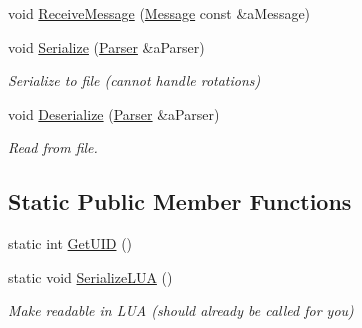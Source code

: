 \begin{DoxyCompactItemize}
\item 
void \hyperlink{classTransform_aecbe05756c579fb4e36cbf6b2e36e58c}{Receive\+Message} (\hyperlink{classMessage}{Message} const \&a\+Message)
\item 
void \hyperlink{classTransform_a2fe5546a59d933a11316966b9ec49e19}{Serialize} (\hyperlink{classParser}{Parser} \&a\+Parser)
\begin{DoxyCompactList}\small\item\em Serialize to file (cannot handle rotations) \end{DoxyCompactList}\item 
void \hyperlink{classTransform_a4bc75f2d8356608ffdbc1ec56cd86a27}{Deserialize} (\hyperlink{classParser}{Parser} \&a\+Parser)
\begin{DoxyCompactList}\small\item\em Read from file. \end{DoxyCompactList}\end{DoxyCompactItemize}
\subsection*{Static Public Member Functions}
\begin{DoxyCompactItemize}
\item 
static int \hyperlink{classTransform_a0a99fa2a6f920195d46410e0c453384d}{Get\+U\+ID} ()
\item 
static void \hyperlink{classTransform_aa992b0ff5f9e9ab334b3142b6727754e}{Serialize\+L\+UA} ()
\begin{DoxyCompactList}\small\item\em Make readable in L\+UA (should already be called for you) \end{DoxyCompactList}\end{DoxyCompactItemize}
